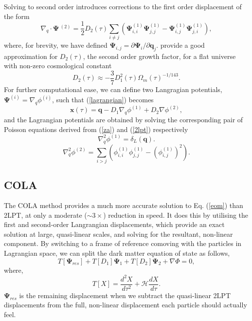 \documentclass[5p,authoryear]{elsarticle}
\begin{document}
Solving to second order introduces corrections to the first order displacement of the form
\begin{equation}
\nabla_{q} \cdot \boldsymbol{\Psi}\,^{(2)}= \frac{1}{2}D_{2}(\tau)\sum_{i\neq j}\left(\boldsymbol{\Psi}^{(1)}_{i,i}\boldsymbol{\Psi}^{(1)}_{j,j} - \boldsymbol{\Psi}^{(1)}_{i,j}\boldsymbol{\Psi}^{(1)}_{j,i} \right),
\label{2lpt}
\end{equation}
where, for brevity, we have defined $\boldsymbol{\Psi}_{i,j}=\partial \boldsymbol{\Psi}_{i}/\partial \boldsymbol{q}_{j}$.
\cite{Bouchet1995} provide a good approximation for $D_{2}(\tau)$, the second order growth factor, for a flat universe with non-zero cosmological constant
\begin{equation}
D_{2}(\tau) \approx -\frac{3}{7}D^{2}_{1}(\tau)\Omega_{m}(\tau)^{-1/143}. 
\end{equation}
For further computational ease, we can define two Langragian potentials, $\boldsymbol{\Psi}^{(i)}=\nabla_{q}\phi^{(i)}$, such that (\ref{lagrangian}) becomes
\begin{equation}
\boldsymbol{x}(\tau) = \boldsymbol{q} - D_{1}\nabla_{q}\phi^{(1)} + D_{2}\nabla\phi^{(2)},
\end{equation}
and the Lagrangian potentials are obtained by solving the corresponding pair of Poisson equations derived from (\ref{za}) and (\ref{2lpt}) respectively
\begin{equation}
\nabla_{q}^{2}\phi^{(1)} = \delta_{L}(\boldsymbol{q}).
\end{equation}
\begin{equation}
\nabla_{q}^{2}\phi^{(2)} =\sum_{i>j}\left(\phi_{i,i}^{(1)}\phi_{j,j}^{(1)} - (\phi_{i,j}^{(1)})^{2}\right).
\end{equation}

\subsection{COLA}
The COLA method \citep{Tassev2013} provides a much more accurate solution to Eq. (\ref{eom}) than 2LPT, at only a moderate ($\sim 3\times$) reduction in speed. It does this by utilising the first and second-order Langrangian displacements, which provide an exact solution at large, quasi-linear scales, and solving for the resultant, non-linear component. By switching to a frame of reference comoving with the particles in Lagrangian space, we can split the dark matter equation of state as follows,
\begin{equation}
T[\boldsymbol{\Psi}_{res}]+ T[{D}_{1}]\boldsymbol{\Psi}_{1} + T[{D}_{2}]\boldsymbol{\Psi}_{2} + \nabla \Phi = 0,
\end{equation}
where,
\begin{equation}
T[X] = \frac{d^{2}X}{d\tau^{2}} + \mathcal{H}\frac{dX}{d\tau}.
\end{equation}
$\boldsymbol{\Psi}_{res}$ is the remaining displacement when we subtract the quasi-linear 2LPT displacements from the full, non-linear displacement each particle should actually feel. 
\end{document}
